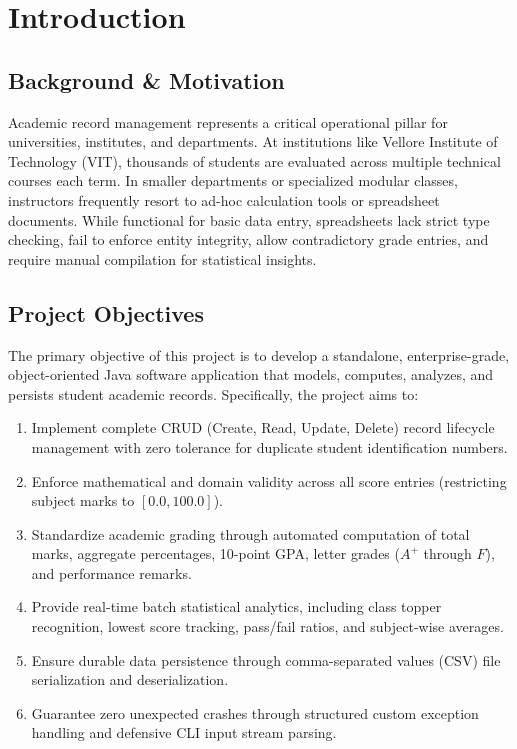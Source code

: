 \documentclass[12pt,a4paper]{report}
\begin{document}
\tableofcontents
\newpage

\chapter{Introduction}

\section{Background \& Motivation}
Academic record management represents a critical operational pillar for universities, institutes, and departments. At institutions like Vellore Institute of Technology (VIT), thousands of students are evaluated across multiple technical courses each term. In smaller departments or specialized modular classes, instructors frequently resort to ad-hoc calculation tools or spreadsheet documents. While functional for basic data entry, spreadsheets lack strict type checking, fail to enforce entity integrity, allow contradictory grade entries, and require manual compilation for statistical insights.

\section{Project Objectives}
The primary objective of this project is to develop a standalone, enterprise-grade, object-oriented Java software application that models, computes, analyzes, and persists student academic records. Specifically, the project aims to:
\begin{enumerate}
    \item Implement complete CRUD (Create, Read, Update, Delete) record lifecycle management with zero tolerance for duplicate student identification numbers.
    \item Enforce mathematical and domain validity across all score entries (restricting subject marks to $[0.0, 100.0]$).
    \item Standardize academic grading through automated computation of total marks, aggregate percentages, 10-point GPA, letter grades ($A^+$ through $F$), and performance remarks.
    \item Provide real-time batch statistical analytics, including class topper recognition, lowest score tracking, pass/fail ratios, and subject-wise averages.
    \item Ensure durable data persistence through comma-separated values (CSV) file serialization and deserialization.
    \item Guarantee zero unexpected crashes through structured custom exception handling and defensive CLI input stream parsing.
\end{enumerate}
\end{document}
